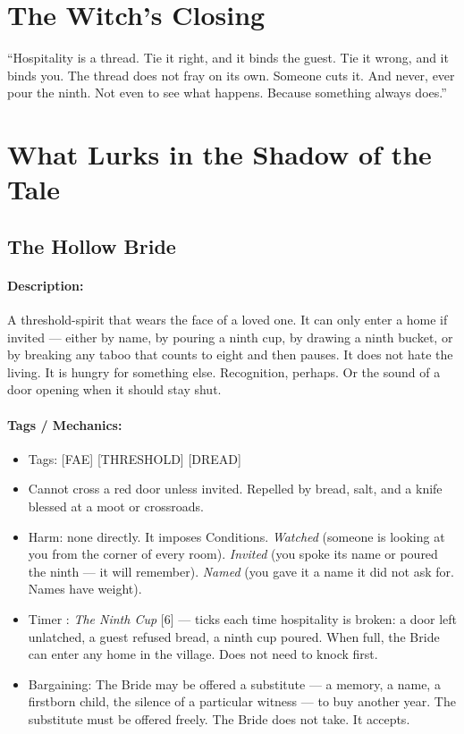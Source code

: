 \section*{The Witch's Closing}

``Hospitality is a thread. Tie it right, and it binds the guest. Tie it wrong, and it binds you. The thread does not fray on its own. Someone cuts it. And never, ever pour the ninth. Not even to see what happens. Because something always does.''

\section*{What Lurks in the Shadow of the Tale}

\subsection*{The Hollow Bride}

\paragraph{Description:}

A threshold-spirit that wears the face of a loved one. It can only enter a home if invited --- either by name, by pouring a ninth cup, by drawing a ninth bucket, or by breaking any taboo that counts to eight and then pauses. It does not hate the living. It is hungry for something else. Recognition, perhaps. Or the sound of a door opening when it should stay shut.

\paragraph{Tags / Mechanics:}

\begin{itemize}
\item Tags: [FAE] [THRESHOLD] [DREAD]
\item Cannot cross a red door unless invited. Repelled by bread, salt, and a knife blessed at a moot or crossroads.
\item Harm: none directly. It imposes Conditions. \textit{Watched} (someone is looking at you from the corner of every room). \textit{Invited} (you spoke its name or poured the ninth --- it will remember). \textit{Named} (you gave it a name it did not ask for. Names have weight).
\item Timer : \textit{The Ninth Cup} [6] --- ticks each time hospitality is broken: a door left unlatched, a guest refused bread, a ninth cup poured. When full, the Bride can enter any home in the village. Does not need to knock first.
\item Bargaining: The Bride may be offered a substitute --- a memory, a name, a firstborn child, the silence of a particular witness --- to buy another year. The substitute must be offered freely. The Bride does not take. It accepts.
\end{itemize}

